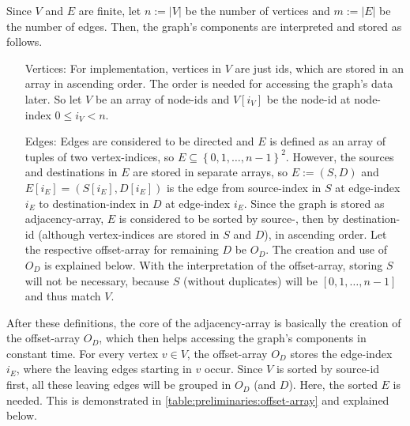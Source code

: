     Since $V$ and $E$ are finite, let $n := \left| V \right|$ be the number of vertices and $m := \left| E \right|$ be the number of edges.
    Then, the graph's components are interpreted and stored as follows.
    \begin{itemize}
        \item[Vertices:]
            For implementation, vertices in $V$ are just ids, which are stored in an array in ascending order.
            The order is needed for accessing the graph's data later.
            So let $V$ be an array of node-ids and $V[i_V]$ be the node-id at node-index $0 \le i_V < n$.
        \item[Edges:]
            Edges are considered to be directed and $E$ is defined as an array of tuples of two vertex-indices, so $E \subseteq \left\{ 0, 1, \dots, n-1 \right\}^2$.
            However, the sources and destinations in $E$ are stored in separate arrays, so $E := (S, D)$ and $E[i_E] = (S[i_E], D[i_E])$ is the edge from source-index in $S$ at edge-index $i_E$ to destination-index in $D$ at edge-index $i_E$.
            Since the graph is stored as adjacency-array, $E$ is considered to be sorted by source-, then by destination-id (although vertex-indices are stored in $S$ and $D$), in ascending order.
            Let the respective offset-array for remaining $D$ be $O_D$.
            The creation and use of $O_D$ is explained below.
            With the interpretation of the offset-array, storing $S$ will not be necessary, because $S$ (without duplicates) will be $[0, 1, \dots, n-1]$ and thus match $V$.
    \end{itemize}

    After these definitions, the core of the adjacency-array is basically the creation of the offset-array $O_D$, which then helps accessing the graph's components in constant time.
    For every vertex $v \in V$, the offset-array $O_D$ stores the edge-index $i_E$, where the leaving edges starting in $v$ occur.
    Since $V$ is sorted by source-id first, all these leaving edges will be grouped in $O_D$ (and $D$).
    Here, the sorted $E$ is needed.
    This is demonstrated in \cref{table:preliminaries:offset-array} and explained below.

